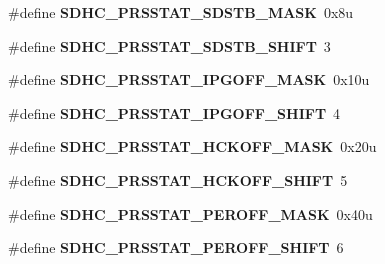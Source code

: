 \begin{DoxyCompactItemize}
\item 
\hypertarget{group___s_d_h_c___register___masks_ga45ba66986bd9e2c6419e1a4358b6a05e}{}\#define {\bfseries S\+D\+H\+C\+\_\+\+P\+R\+S\+S\+T\+A\+T\+\_\+\+S\+D\+S\+T\+B\+\_\+\+M\+A\+S\+K}~0x8u\label{group___s_d_h_c___register___masks_ga45ba66986bd9e2c6419e1a4358b6a05e}

\item 
\hypertarget{group___s_d_h_c___register___masks_ga4857c2040b9dc29336795fba391dd1ca}{}\#define {\bfseries S\+D\+H\+C\+\_\+\+P\+R\+S\+S\+T\+A\+T\+\_\+\+S\+D\+S\+T\+B\+\_\+\+S\+H\+I\+F\+T}~3\label{group___s_d_h_c___register___masks_ga4857c2040b9dc29336795fba391dd1ca}

\item 
\hypertarget{group___s_d_h_c___register___masks_ga60c111aa5a4259d9b556a30aa9cbf891}{}\#define {\bfseries S\+D\+H\+C\+\_\+\+P\+R\+S\+S\+T\+A\+T\+\_\+\+I\+P\+G\+O\+F\+F\+\_\+\+M\+A\+S\+K}~0x10u\label{group___s_d_h_c___register___masks_ga60c111aa5a4259d9b556a30aa9cbf891}

\item 
\hypertarget{group___s_d_h_c___register___masks_gab62b9ee7261708d8741ea70ecb103520}{}\#define {\bfseries S\+D\+H\+C\+\_\+\+P\+R\+S\+S\+T\+A\+T\+\_\+\+I\+P\+G\+O\+F\+F\+\_\+\+S\+H\+I\+F\+T}~4\label{group___s_d_h_c___register___masks_gab62b9ee7261708d8741ea70ecb103520}

\item 
\hypertarget{group___s_d_h_c___register___masks_ga3fea3ced329a19b4f5ef4b596afa1487}{}\#define {\bfseries S\+D\+H\+C\+\_\+\+P\+R\+S\+S\+T\+A\+T\+\_\+\+H\+C\+K\+O\+F\+F\+\_\+\+M\+A\+S\+K}~0x20u\label{group___s_d_h_c___register___masks_ga3fea3ced329a19b4f5ef4b596afa1487}

\item 
\hypertarget{group___s_d_h_c___register___masks_gac28dd17af6a554003b82c5ef2a8a29ff}{}\#define {\bfseries S\+D\+H\+C\+\_\+\+P\+R\+S\+S\+T\+A\+T\+\_\+\+H\+C\+K\+O\+F\+F\+\_\+\+S\+H\+I\+F\+T}~5\label{group___s_d_h_c___register___masks_gac28dd17af6a554003b82c5ef2a8a29ff}

\item 
\hypertarget{group___s_d_h_c___register___masks_ga6561c88825587d265f09036e40dc741a}{}\#define {\bfseries S\+D\+H\+C\+\_\+\+P\+R\+S\+S\+T\+A\+T\+\_\+\+P\+E\+R\+O\+F\+F\+\_\+\+M\+A\+S\+K}~0x40u\label{group___s_d_h_c___register___masks_ga6561c88825587d265f09036e40dc741a}

\item 
\hypertarget{group___s_d_h_c___register___masks_ga5fbe36972520968a101550517bd82895}{}\#define {\bfseries S\+D\+H\+C\+\_\+\+P\+R\+S\+S\+T\+A\+T\+\_\+\+P\+E\+R\+O\+F\+F\+\_\+\+S\+H\+I\+F\+T}~6\label{group___s_d_h_c___register___masks_ga5fbe36972520968a101550517bd82895}


\end{DoxyCompactItemize}
